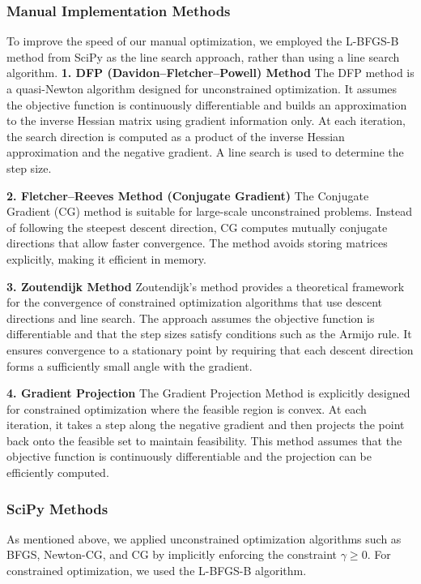 \documentclass[12pt]{article}
\begin{document}
\subsubsection{Manual Implementation Methods}
To improve the speed of our manual optimization, we employed the L-BFGS-B method from SciPy as the line search approach, rather than using a line search algorithm. 
\textbf{1. DFP (Davidon–Fletcher–Powell) Method}
The DFP method is a quasi-Newton algorithm designed for unconstrained optimization. It assumes the objective function is continuously differentiable and builds an approximation to the inverse Hessian matrix using gradient information only. At each iteration, the search direction is computed as a product of the inverse Hessian approximation and the negative gradient. A line search is used to determine the step size. 

\textbf{2. Fletcher–Reeves Method (Conjugate Gradient) }
The Conjugate Gradient (CG) method is suitable for large-scale unconstrained problems. Instead of following the steepest descent direction, CG computes mutually conjugate directions that allow faster convergence. The method avoids storing matrices explicitly, making it efficient in memory.

\textbf{3. Zoutendijk Method}
Zoutendijk's method provides a theoretical framework for the convergence of constrained optimization algorithms that use descent directions and line search. The approach assumes the objective function is differentiable and that the step sizes satisfy conditions such as the Armijo rule. It ensures convergence to a stationary point by requiring that each descent direction forms a sufficiently small angle with the gradient.

\textbf{4. Gradient Projection}
The Gradient Projection Method is explicitly designed for constrained optimization where the feasible region is convex. At each iteration, it takes a step along the negative gradient and then projects the point back onto the feasible set to maintain feasibility. This method assumes that the objective function is continuously differentiable and the projection can be efficiently computed.


\subsubsection{SciPy Methods}

As mentioned above, we applied unconstrained optimization algorithms such as BFGS, Newton-CG, and CG by implicitly enforcing the constraint $\gamma\geq0$. For constrained optimization, we used the L-BFGS-B algorithm. 
\end{document}
